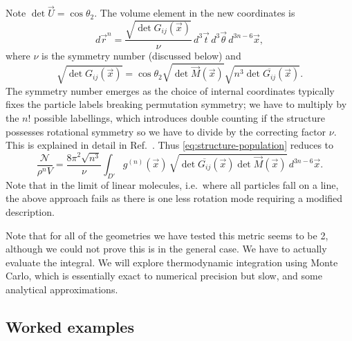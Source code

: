 \documentclass[11pt,twoside]{report}
\begin{document}
Note $\det{\vec{U}} = \cos{\theta_2}$.
The volume element in the new coordinates is
\begin{equation}
  d\vec{r}^n = \frac{\sqrt{\det G_{ij}(\vec{x})}}{\nu}
  \, d^3 \vec{t} \, d^3 \vec{\theta} \, d^{3n-6} \vec{x},
\end{equation}
where $\nu$ is the symmetry number (discussed below) and
\begin{equation}
  \sqrt{\det G_{ij}(\vec{x})} =
  \cos{\theta_2} \sqrt{\det{\vec{M}(\vec{x})}}
  \sqrt{n^3 \det{\overline{G_{ij}}(\vec{x})}}.
\end{equation}
The symmetry number emerges as the choice of internal coordinates typically fixes the particle labels breaking permutation symmetry; we have to multiply by the $n!$ possible labellings, which introduces double counting if the structure possesses rotational symmetry so we have to divide by the correcting factor $\nu$.
This is explained in detail in Ref.\ \cite{CatesSM2015}.
Thus \eqref{eq:structure-population} reduces to
\begin{equation}\label{eq:structural-partition-function-detailed}
  \frac{\mathcal{N}}{\rho^n V}
  =
  \frac{8\pi^2 \sqrt{n^3}}{\nu} \int_{D'}
  g^{(n)}(\vec{x}) \,
  \sqrt{\det{\overline{G_{ij}}(\vec{x})} \det{\vec{M}(\vec{x})}}
  \, d^{3n-6} \vec{x}.
\end{equation}
Note that in the limit of linear molecules, i.e.\ where all particles fall on a line, the above approach fails as there is one less rotation mode requiring a modified description.

Note that for all of the geometries we have tested this metric seems to be 2, although we could not prove this is in the general case.
We have to actually evaluate the integral.
We will explore thermodynamic integration using Monte Carlo, which is essentially exact to numerical precision but slow, and some analytical approximations.

\subsection{Worked examples}


\end{document}
